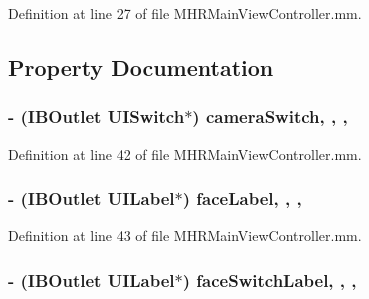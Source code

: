 Definition at line 27 of file M\+H\+R\+Main\+View\+Controller.\+mm.



\subsection{Property Documentation}
\hypertarget{category_m_h_r_main_view_controller_07_08_a64545a3386e0d53f59af539582caafd4}{
\subsubsection[{camera\+Switch}]{\setlength{\rightskip}{0pt plus 5cm}-\/ (I\+B\+Outlet U\+I\+Switch$\ast$) camera\+Switch\hspace{0.3cm}{\ttfamily [read]}, {\ttfamily [write]}, {\ttfamily [nonatomic]}, {\ttfamily [weak]}}}\label{category_m_h_r_main_view_controller_07_08_a64545a3386e0d53f59af539582caafd4}


Definition at line 42 of file M\+H\+R\+Main\+View\+Controller.\+mm.

\hypertarget{category_m_h_r_main_view_controller_07_08_a2457cf5b05fac6f6cb9483997159f5f6}{
\subsubsection[{face\+Label}]{\setlength{\rightskip}{0pt plus 5cm}-\/ (I\+B\+Outlet U\+I\+Label$\ast$) face\+Label\hspace{0.3cm}{\ttfamily [read]}, {\ttfamily [write]}, {\ttfamily [nonatomic]}, {\ttfamily [weak]}}}\label{category_m_h_r_main_view_controller_07_08_a2457cf5b05fac6f6cb9483997159f5f6}


Definition at line 43 of file M\+H\+R\+Main\+View\+Controller.\+mm.

\hypertarget{category_m_h_r_main_view_controller_07_08_addd32f0cbd1a4d5bfe69a837b3505ed6}{
\subsubsection[{face\+Switch\+Label}]{\setlength{\rightskip}{0pt plus 5cm}-\/ (I\+B\+Outlet U\+I\+Label$\ast$) face\+Switch\+Label\hspace{0.3cm}{\ttfamily [read]}, {\ttfamily [write]}, {\ttfamily [nonatomic]}, {\ttfamily [weak]}}}\label{category_m_h_r_main_view_controller_07_08_addd32f0cbd1a4d5bfe69a837b3505ed6}


